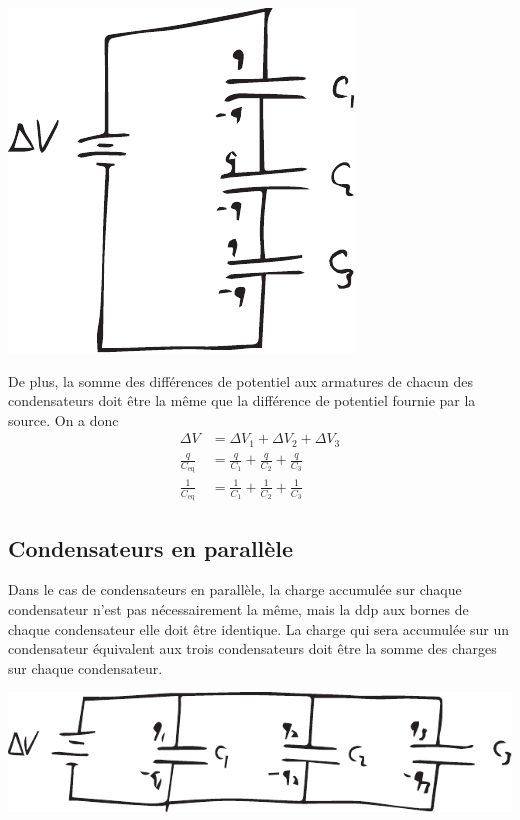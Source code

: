 \begin{center}
  \includegraphics[scale=0.5]{05-condensateurs/figures/condensateur-serie.pdf}
\end{center}

De plus, la somme des différences de potentiel aux armatures de chacun des
condensateurs doit être la même que la différence de potentiel fournie par la
source. On a donc
\begin{align*}
  \Delta V &= \Delta V_1 + \Delta V_2 + \Delta V_3  \\
  \frac{q}{C_\mathrm{eq}} &= \frac{q}{C_1} + \frac{q}{C_2} + \frac{q}{C_3}  \\
  \frac{1}{C_\mathrm{eq}} &= \frac{1}{C_1} + \frac{1}{C_2} + \frac{1}{C_3}
\end{align*}



\subsection*{Condensateurs en parallèle}


Dans le cas de condensateurs en parallèle, la charge accumulée sur chaque
condensateur n'est pas nécessairement la même, mais la ddp aux bornes de chaque
condensateur elle doit être identique. La charge qui sera accumulée sur un
condensateur équivalent aux trois condensateurs doit être la somme des charges
sur chaque condensateur.

\begin{center}
  \includegraphics[scale=0.5]{05-condensateurs/figures/condensateur-parallele.pdf}
\end{center}

